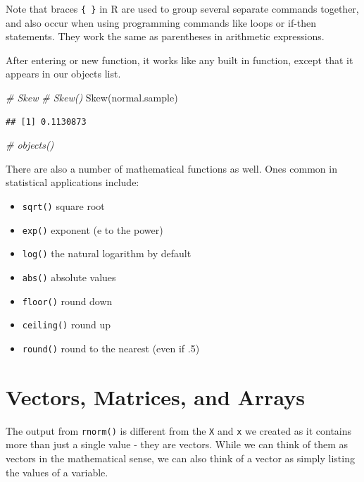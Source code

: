 \documentclass[
]{book}
\newenvironment{Shaded}{\begin{snugshade}}{\end{snugshade}}
\newcommand{\CommentTok}[1]{\textcolor[rgb]{0.56,0.35,0.01}{\textit{#1}}}
\newcommand{\FunctionTok}[1]{\textcolor[rgb]{0.00,0.00,0.00}{#1}}
\newcommand{\NormalTok}[1]{#1}
\providecommand{\tightlist}{%
  \setlength{\itemsep}{0pt}\setlength{\parskip}{0pt}}
\begin{document}
Note that braces \texttt{\{\ \}} in R are used to group several separate commands together, and also occur when using programming commands like loops or if-then statements. They work the same as parentheses in arithmetic expressions.

After entering or new function, it works like any built in function, except that it appears in our objects list.

\begin{Shaded}
\begin{Highlighting}[]
\CommentTok{\# Skew}
\CommentTok{\# Skew()}
\FunctionTok{Skew}\NormalTok{(normal.sample)}
\end{Highlighting}
\end{Shaded}

\begin{verbatim}
## [1] 0.1130873
\end{verbatim}

\begin{Shaded}
\begin{Highlighting}[]
\CommentTok{\# objects()}
\end{Highlighting}
\end{Shaded}

There are also a number of mathematical functions as well. Ones common in statistical applications include:

\begin{itemize}
\tightlist
\item
  \texttt{sqrt()} square root
\item
  \texttt{exp()} exponent (e to the power)
\item
  \texttt{log()} the natural logarithm by default
\item
  \texttt{abs()} absolute values
\item
  \texttt{floor()} round down
\item
  \texttt{ceiling()} round up
\item
  \texttt{round()} round to the nearest (even if .5)
\end{itemize}

\hypertarget{vectors-matrices-and-arrays}{%
\section{Vectors, Matrices, and Arrays}\label{vectors-matrices-and-arrays}}

The output from \texttt{rnorm()} is different from the \texttt{X} and \texttt{x} we created as it contains more than just a single value - they are vectors. While we can think of them as vectors in the mathematical sense, we can also think of a vector as simply listing the values of a variable.
\end{document}
